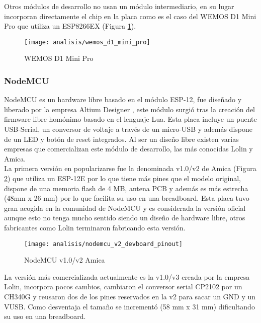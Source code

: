 \documentclass[../proyecto.tex]{subfiles}
\begin{document}
Otros módulos de desarrollo no usan un módulo intermediario, en su lugar incorporan directamente el chip en la placa como es el caso del WEMOS D1 Mini Pro \cite{wemos_d1_mini_pro} que utiliza un ESP8266EX (Figura \ref{fig:wemos_d1_mini_pro}).\\

\begin{figure}[h]
\centering
\texttt{[image: analisis/wemos\_d1\_mini\_pro]}
\caption{WEMOS D1 Mini Pro}
\label{fig:wemos_d1_mini_pro}
\end{figure}

\subsubsection{NodeMCU}
NodeMCU es un hardware libre basado en el módulo ESP-12, fue diseñado y liberado por la empresa Altium Designer \cite{nodemcu_devkit_repository}, este módulo surgió tras la creación del firmware libre homónimo basado en el lenguaje Lua. Esta placa incluye un puente USB-Serial, un conversor de voltaje  a través de un micro-USB y además dispone de un LED y botón de reset integrados. Al ser un diseño libre existen varias empresas que comercializan este módulo de desarrollo, las más conocidas Lolin y Amica.\\



La primera versión en popularizarse fue la denominada v1.0/v2 de Amica (Figura \ref{fig:nodemcu_v2_devboard_pinout}) que utiliza un ESP-12E por lo que tiene más pines que el modelo original, dispone de una memoria flash de 4 MB, antena PCB y además es más estrecha (48mm x 26 mm) por lo que facilita su uso en una breadboard. Esta placa tuvo gran acogida en la comunidad de NodeMCU y es considerada la versión oficial aunque esto no tenga mucho sentido siendo un diseño de hardware libre, otros fabricantes como Lolin terminaron fabricando esta versión.\\

\begin{figure}[h]
\centering
\texttt{[image: analisis/nodemcu\_v2\_devboard\_pinout]}
\caption{NodeMCU v1.0/v2 Amica}
\label{fig:nodemcu_v2_devboard_pinout}
\end{figure}

La versión más comercializada actualmente es la v1.0/v3 creada por la empresa Lolin, incorpora pocos cambios, cambiaron el conversor serial CP2102 por un CH340G y reusaron dos de los pines reservados en la v2 para sacar un GND y un VUSB. Como desventaja el tamaño se incrementó (58 mm x  31 mm) dificultando su uso en una breadboard.\\
\end{document}
